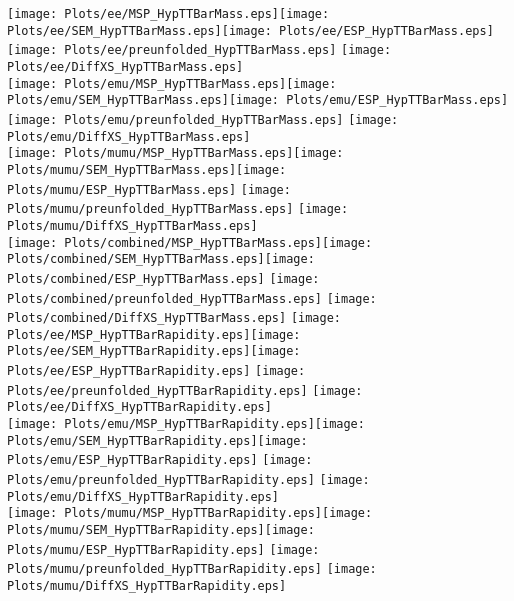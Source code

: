 \documentclass[a4paper,10pt]{article}
\begin{document}
\newpage
\texttt{[image: Plots/ee/MSP\_HypTTBarMass.eps]}\texttt{[image: Plots/ee/SEM\_HypTTBarMass.eps]}\texttt{[image: Plots/ee/ESP\_HypTTBarMass.eps]} \texttt{[image: Plots/ee/preunfolded\_HypTTBarMass.eps]} \texttt{[image: Plots/ee/DiffXS\_HypTTBarMass.eps]}\\
\texttt{[image: Plots/emu/MSP\_HypTTBarMass.eps]}\texttt{[image: Plots/emu/SEM\_HypTTBarMass.eps]}\texttt{[image: Plots/emu/ESP\_HypTTBarMass.eps]} \texttt{[image: Plots/emu/preunfolded\_HypTTBarMass.eps]} \texttt{[image: Plots/emu/DiffXS\_HypTTBarMass.eps]}\\
\texttt{[image: Plots/mumu/MSP\_HypTTBarMass.eps]}\texttt{[image: Plots/mumu/SEM\_HypTTBarMass.eps]}\texttt{[image: Plots/mumu/ESP\_HypTTBarMass.eps]} \texttt{[image: Plots/mumu/preunfolded\_HypTTBarMass.eps]} \texttt{[image: Plots/mumu/DiffXS\_HypTTBarMass.eps]}\\
\texttt{[image: Plots/combined/MSP\_HypTTBarMass.eps]}\texttt{[image: Plots/combined/SEM\_HypTTBarMass.eps]}\texttt{[image: Plots/combined/ESP\_HypTTBarMass.eps]} \texttt{[image: Plots/combined/preunfolded\_HypTTBarMass.eps]} \texttt{[image: Plots/combined/DiffXS\_HypTTBarMass.eps]}
\newpage
\texttt{[image: Plots/ee/MSP\_HypTTBarRapidity.eps]}\texttt{[image: Plots/ee/SEM\_HypTTBarRapidity.eps]}\texttt{[image: Plots/ee/ESP\_HypTTBarRapidity.eps]} \texttt{[image: Plots/ee/preunfolded\_HypTTBarRapidity.eps]} \texttt{[image: Plots/ee/DiffXS\_HypTTBarRapidity.eps]}\\
\texttt{[image: Plots/emu/MSP\_HypTTBarRapidity.eps]}\texttt{[image: Plots/emu/SEM\_HypTTBarRapidity.eps]}\texttt{[image: Plots/emu/ESP\_HypTTBarRapidity.eps]} \texttt{[image: Plots/emu/preunfolded\_HypTTBarRapidity.eps]} \texttt{[image: Plots/emu/DiffXS\_HypTTBarRapidity.eps]}\\
\texttt{[image: Plots/mumu/MSP\_HypTTBarRapidity.eps]}\texttt{[image: Plots/mumu/SEM\_HypTTBarRapidity.eps]}\texttt{[image: Plots/mumu/ESP\_HypTTBarRapidity.eps]} \texttt{[image: Plots/mumu/preunfolded\_HypTTBarRapidity.eps]} \texttt{[image: Plots/mumu/DiffXS\_HypTTBarRapidity.eps]}\\
\end{document}
